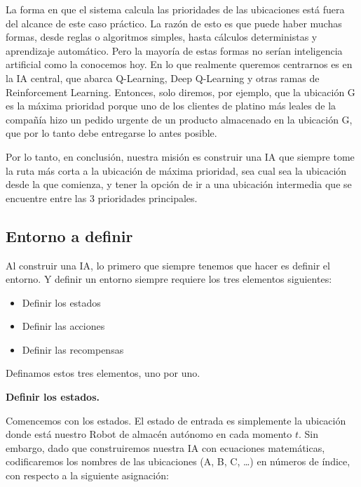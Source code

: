 \documentclass[
]{book}
\providecommand{\tightlist}{%
  \setlength{\itemsep}{0pt}\setlength{\parskip}{0pt}}
\begin{document}
La forma en que el sistema calcula las prioridades de las ubicaciones está fuera del alcance de este caso práctico. La razón de esto es que puede haber muchas formas, desde reglas o algoritmos simples, hasta cálculos deterministas y aprendizaje automático. Pero la mayoría de estas formas no serían inteligencia artificial como la conocemos hoy. En lo que realmente queremos centrarnos es en la IA central, que abarca Q-Learning, Deep Q-Learning y otras ramas de Reinforcement Learning. Entonces, solo diremos, por ejemplo, que la ubicación G es la máxima prioridad porque uno de los clientes de platino más leales de la compañía hizo un pedido urgente de un producto almacenado en la ubicación G, que por lo tanto debe entregarse lo antes posible.

Por lo tanto, en conclusión, nuestra misión es construir una IA que siempre tome la ruta más corta a la ubicación de máxima prioridad, sea cual sea la ubicación desde la que comienza, y tener la opción de ir a una ubicación intermedia que se encuentre entre las 3 prioridades principales.

\hypertarget{entorno-a-definir}{%
\subsection{Entorno a definir}\label{entorno-a-definir}}

Al construir una IA, lo primero que siempre tenemos que hacer es definir el entorno. Y definir un entorno siempre requiere los tres elementos siguientes:

\begin{itemize}
\tightlist
\item
  Definir los estados
\item
  Definir las acciones
\item
  Definir las recompensas
\end{itemize}

Definamos estos tres elementos, uno por uno.

\textbf{Definir los estados.}

Comencemos con los estados. El estado de entrada es simplemente la ubicación donde está nuestro Robot de almacén autónomo en cada momento \(t\). Sin embargo, dado que construiremos nuestra IA con ecuaciones matemáticas, codificaremos los nombres de las ubicaciones (A, B, C, \ldots) en números de índice, con respecto a la siguiente asignación:
\end{document}
